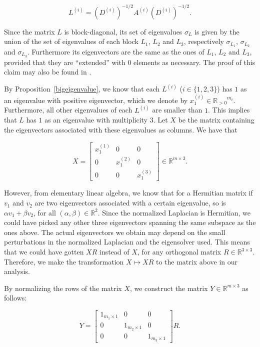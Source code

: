 \begin{equation}
   L^{(i)} = \left( D^{(i)} \right) ^{-1/2} A^{(i)} \left( D^{(i)} \right) ^{-1/2}.
\end{equation}

Since the matrix $L$ is block-diagonal, its set of eigenvalues $\sigma _L$ is given by the union of the set of eigenvalues of each block $L_1$, $L_2$ and $L_3$, respectively $\sigma_{L_1}$, $\sigma_{L_2}$ and $\sigma_{L_3}$.
Furthermore its eigenvectors are the same as the ones of $L_1$, $L_2$ and $L_3$, provided that they are ``extended'' with $0$ elements as necessary. 
The proof of this claim may also be found in \cite{mahoney}.

By Proposition~\vref{bigeigenvalue}, we know that each $L^{(i)}$ ($i \in \{1, 2, 3 \}$) has $1$ as an eigenvalue with positive eigenvector, which we denote by $x_1^{(i)} \in {\mathbb R_{>0}}^{m_i} $. Furthermore, all other eigenvalues of each $L^{(i)}$ are smaller than $1$.
This implies that $L$ has $1$ as an eigenvalue with multiplicity $3$.
Let $X$ be the matrix containing the eigenvectors associated with these eigenvalues as columns. We have that 

\begin{equation}
   X =
   \begin{bmatrix}
      x_1^{(1)} & 0 & 0 \\
      0 & x_1^{(2)} & 0 \\
      0 & 0 & x_1^{(3)}
   \end{bmatrix}
   \in \mathbb R^{m \times 3}.
\end{equation}

However, from elementary linear algebra, we know that for a Hermitian matrix if $v_1$ and $v_2$ are two eigenvectors associated with a certain eigenvalue, so is $\alpha v_1 + \beta v_2$, for all $(\alpha, \beta) \in \mathbb R ^2$.
Since the normalized Laplacian is Hermitian, we could have picked any other three eigenvectors spanning the same subspace as the ones above.
The actual eigenvectors we obtain may depend on the small perturbations in the normalized Laplacian and the eigensolver used.
This means that we could have gotten $XR$ instead of $X$, for any orthogonal matrix $R \in \mathbb{R}^{3 \times 3}$.
Therefore, we make the transformation $X \longmapsto XR$ to the matrix above in our analysis.

By normalizing the rows of the matrix $X$, we construct the matrix $Y \in \mathbb{R}^{m \times 3}$ as follows:

\begin{equation}\label{y}
   Y = 
   \begin{bmatrix}
      1_{m_1 \times 1} & 0 & 0 \\
      0 & 1_{m_2 \times 1} & 0 \\
      0 & 0 & 1_{m_3 \times 1} 
   \end{bmatrix}R.
\end{equation}


